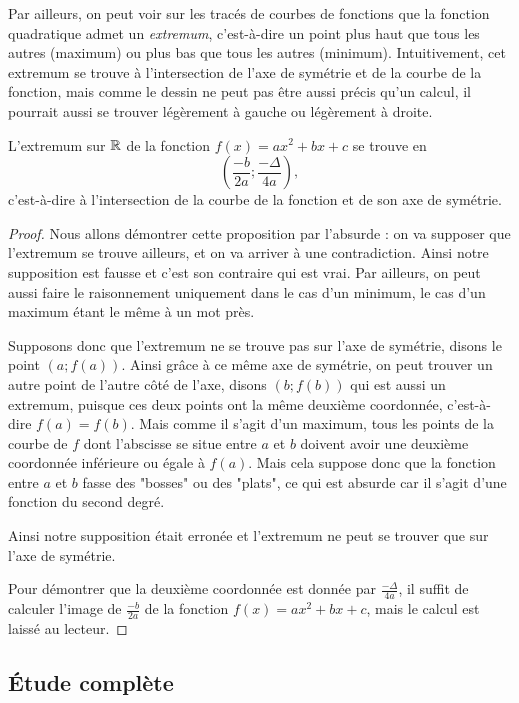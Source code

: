Par ailleurs, on peut voir sur les tracés de courbes de fonctions que la fonction quadratique admet un \emph{extremum}, c'est-à-dire un point plus haut que tous les autres (maximum) ou plus bas que tous les autres (minimum). Intuitivement, cet extremum se trouve à l'intersection de l'axe de symétrie et de la courbe de la fonction, mais comme le dessin ne peut pas être aussi précis qu'un calcul, il pourrait aussi se trouver légèrement à gauche ou légèrement à droite.

\begin{proposition}
L'extremum sur $\mathbb{R}$ de la fonction $f(x) = ax^2 + bx + c$ se trouve en 
$$
\left(\frac{-b}{2a};\frac{-\Delta}{4a} \right),
$$
c'est-à-dire à l'intersection de la courbe de la fonction et de son axe de symétrie.
\end{proposition}

\begin{proof}
Nous allons démontrer cette proposition par l'absurde : on va supposer que l'extremum se trouve ailleurs, et on va arriver à une contradiction. Ainsi notre supposition est fausse et c'est son contraire qui est vrai. Par ailleurs, on peut aussi faire le raisonnement uniquement dans le cas d'un minimum, le cas d'un maximum étant le même à un mot près.

Supposons donc que l'extremum ne se trouve pas sur l'axe de symétrie, disons le point $(a;f(a))$. Ainsi grâce à ce même axe de symétrie, on peut trouver un autre point de l'autre côté de l'axe, disons $(b;f(b))$ qui est aussi un extremum, puisque ces deux points ont la même deuxième coordonnée, c'est-à-dire $f(a) = f(b)$. Mais comme il s'agit d'un maximum, tous les points de la courbe de $f$ dont l'abscisse se situe entre $a$ et $b$ doivent avoir une deuxième coordonnée inférieure ou égale à $f(a)$. Mais cela suppose donc que la fonction entre $a$ et $b$ fasse des "bosses" ou des "plats", ce qui est absurde car il s'agit d'une fonction du second degré.

Ainsi notre supposition était erronée et l'extremum ne peut se trouver que sur l'axe de symétrie.

Pour démontrer que la deuxième coordonnée est donnée par $\frac{-\Delta}{4a}$, il suffit de calculer l'image de $\frac{-b}{2a}$ de la fonction $f(x) = ax^2 + bx + c$, mais le calcul est laissé au lecteur.

\end{proof}

\subsection{Étude complète}

